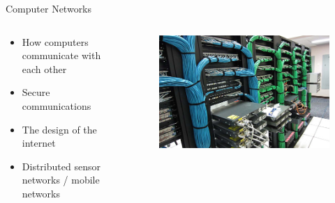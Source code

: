 \documentclass{beamer}
\begin{document}
\begin{frame}{Computer Networks}
\begin{columns}
	\begin{column}{.45\textwidth}
		\begin{itemize}
			\item How computers communicate with each other
			\item Secure communications
			\item The design of the internet
			\item Distributed sensor networks / mobile networks
		\end{itemize}
	\end{column}
	\begin{column}{.55\textwidth}
		\begin{figure}
			\includegraphics[width=\linewidth]{img/cables.jpg}
		\end{figure}
	\end{column}
\end{columns}
\end{frame}
\end{document}
